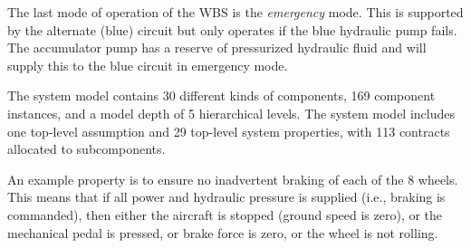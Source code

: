 The last mode of operation of the WBS is the \textit{emergency} mode. This is supported by the alternate (blue) circuit but only operates if the blue hydraulic pump fails. The accumulator pump has a reserve of pressurized hydraulic fluid and will supply this to the blue circuit in emergency mode.

The system model contains 30 different kinds of components, 169 component instances, and a model depth of 5 hierarchical levels.  The system model includes one top-level assumption and  29 top-level system properties, with 113 contracts allocated to subcomponents.  


An example property is to ensure no inadvertent braking of each of the 8 wheels.  This means that if all power and hydraulic pressure is supplied (i.e., braking is commanded), then either the aircraft is stopped (ground speed is zero), or the mechanical pedal is pressed, or brake force is zero, or the wheel is not rolling.













